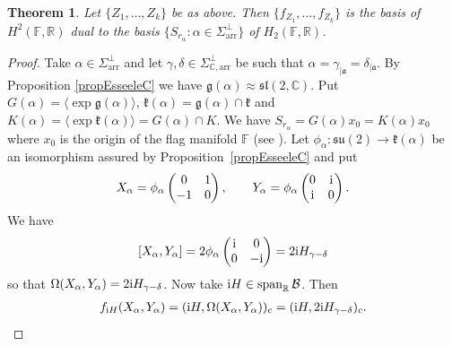 \documentclass[pdftex]{sigma}
\numberwithin{equation}{section}
\newtheorem{Theorem}{Theorem}[section]
\begin{document}
\begin{Theorem}\label{teo.baseZ} Let $\{Z_{1},\ldots,Z_{k}\}$ be as above. Then $\{f_{Z_{1}},\ldots, f_{Z_{k}}\}$ is the basis of $H^{2}( \mathbb{F},\mathbb{R}) $ dual to the basis $\{S_{r_{\alpha }}\colon \alpha \in \Sigma _{\mathrm{arr}}^{\bot }\}$ of $H_{2}(\mathbb{F},\mathbb{R}) $.
\end{Theorem}

\begin{proof}Take $\alpha \in \Sigma _{\mathrm{arr}}^{\bot }$ and let $\gamma,\delta \in\Sigma _{\mathbb{C},\mathrm{arr}}^{\bot }$ be such that $\alpha =\gamma_{\vert \mathfrak{a} }=\delta _{\vert \mathfrak{a}}$. By Proposition \ref{propEsseeleC} we have $\mathfrak{g}( \alpha) \approx \mathfrak{sl}(2,\mathbb{C}) $. Put $G(\alpha) =\langle \exp \mathfrak{g}(\alpha) \rangle $, $\mathfrak{k}(\alpha) =\mathfrak{g}(\alpha) \cap
\mathfrak{k}$ and $K(\alpha) =\langle \exp \mathfrak{k}(\alpha) \rangle =G(\alpha) \cap K$. We have $S_{r_{\alpha }}=G(\alpha) x_{0}=K(\alpha) x_{0}$ where $x_{0}$ is the origin of the flag manifold $\mathbb{F}$ (see \cite[Proposition 1.3]{RSM}). Let $\phi _{\alpha }\colon \mathfrak{su}(2) \rightarrow \mathfrak{k}(\alpha) $ be an isomorphism assured by Proposition~\ref{propEsseeleC} and put
\begin{gather*}
X_{\alpha }=\phi _{\alpha }\left(
\begin{matrix}
0 & 1 \\
-1 & 0%
\end{matrix}
\right), \qquad Y_{\alpha }=\phi _{\alpha }\left(
\begin{matrix}
0 & {\rm i} \\
{\rm i} & 0
\end{matrix}
\right).
\end{gather*}
We have
\begin{gather*}
\lbrack X_{\alpha },Y_{\alpha }]=2\phi _{\alpha }\left(
\begin{matrix}
{\rm i} & 0 \\
0 & -{\rm i}
\end{matrix}
\right) =2{\rm i}H_{\gamma -\delta }
\end{gather*}
so that $\Omega ( X_{\alpha },Y_{\alpha }) =2{\rm i}H_{\gamma -\delta }$. Now take ${\rm i}H\in \operatorname{span}_{\mathbb{R}}\mathcal{B}$. Then
\begin{gather*}
f_{{\rm i}H}( X_{\alpha },Y_{\alpha }) =( {\rm i}H,\Omega (X_{\alpha },Y_{\alpha })) _{c}=( {\rm i}H,2{\rm i}H_{\gamma -\delta}) _{c}.
\end{gather*}%

\end{proof}
\end{document}
